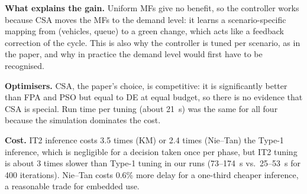 \textbf{What explains the gain.} Uniform MFs give no benefit, so the controller works because CSA moves the MFs to the demand level: it learns a scenario-specific mapping from (vehicles, queue) to a green change, which acts like a feedback correction of the cycle. This is also why the controller is tuned per scenario, as in the paper, and why in practice the demand level would first have to be recognised.

\textbf{Optimisers.} CSA, the paper's choice, is competitive: it is significantly better than FPA and PSO but equal to DE at equal budget, so there is no evidence that CSA is special. Run time per tuning (about 21~s) was the same for all four because the simulation dominates the cost.

\textbf{Cost.} IT2 inference costs 3.5 times (KM) or 2.4 times (Nie--Tan) the Type-1 inference, which is negligible for a decision taken once per phase, but IT2 tuning is about 3 times slower than Type-1 tuning in our runs (73--174~s vs.\ 25--53~s for 400 iterations). Nie--Tan costs 0.6\% more delay for a one-third cheaper inference, a reasonable trade for embedded use.

